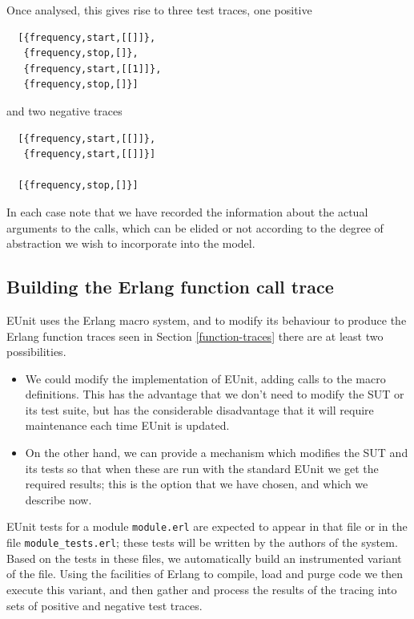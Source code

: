 \documentclass[]{sigplanconf}
\begin{document}
Once analysed, this gives rise to three test traces, one positive
\begin{verbatim}
  [{frequency,start,[[]]},
   {frequency,stop,[]},
   {frequency,start,[[1]]},
   {frequency,stop,[]}]
\end{verbatim}
and two negative traces
\begin{verbatim}
  [{frequency,start,[[]]},
   {frequency,start,[[]]}]
   
  [{frequency,stop,[]}]
\end{verbatim}
In each case note that we have recorded the information about the actual arguments to the calls, which can be elided or not according to the degree of abstraction we wish to incorporate into the model.

\subsection{Building the Erlang function call trace}

EUnit uses the Erlang macro system, and to modify its behaviour to produce the Erlang function traces seen in Section \ref{function-traces} there are at least two possibilities.
\begin{itemize}
\item
We could modify the implementation of EUnit, adding calls to the macro definitions. This has the advantage that we don't need to modify the SUT or its test suite, but has the considerable disadvantage that it will require maintenance each time EUnit is updated.
\item
On the other hand, we can provide a mechanism which modifies the SUT and its tests so that when these are run with the standard EUnit we get the required results; this is the option that we have chosen, and which we describe now.
\end{itemize}
EUnit tests for a module \texttt{module.erl} are expected to appear in that file or in the file \texttt{module\_tests.erl}; these tests will be written by the authors of the system. 
Based on the tests in these files, we automatically build an instrumented variant of the file. Using the facilities of Erlang to compile, load and purge code we then execute this variant, and then gather and process the results of the tracing into sets of positive and negative test traces.
\end{document}
